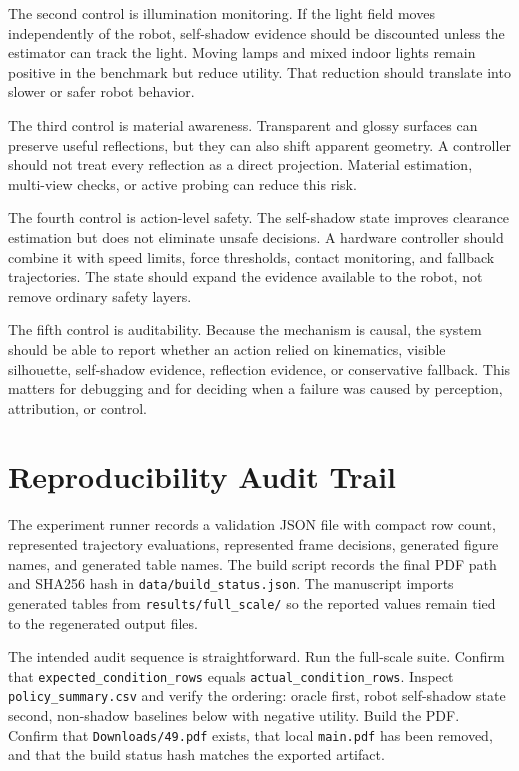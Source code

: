 \documentclass{article}
\begin{document}
The second control is illumination monitoring. If the light field moves independently of the robot, self-shadow evidence should be discounted unless the estimator can track the light. Moving lamps and mixed indoor lights remain positive in the benchmark but reduce utility. That reduction should translate into slower or safer robot behavior.

The third control is material awareness. Transparent and glossy surfaces can preserve useful reflections, but they can also shift apparent geometry. A controller should not treat every reflection as a direct projection. Material estimation, multi-view checks, or active probing can reduce this risk.

The fourth control is action-level safety. The self-shadow state improves clearance estimation but does not eliminate unsafe decisions. A hardware controller should combine it with speed limits, force thresholds, contact monitoring, and fallback trajectories. The state should expand the evidence available to the robot, not remove ordinary safety layers.

The fifth control is auditability. Because the mechanism is causal, the system should be able to report whether an action relied on kinematics, visible silhouette, self-shadow evidence, reflection evidence, or conservative fallback. This matters for debugging and for deciding when a failure was caused by perception, attribution, or control.

\clearpage
\section{Reproducibility Audit Trail}

The experiment runner records a validation JSON file with compact row count, represented trajectory evaluations, represented frame decisions, generated figure names, and generated table names. The build script records the final PDF path and SHA256 hash in \texttt{data/build\_status.json}. The manuscript imports generated tables from \texttt{results/full\_scale/} so the reported values remain tied to the regenerated output files.

The intended audit sequence is straightforward. Run the full-scale suite. Confirm that \texttt{expected\_condition\_rows} equals \texttt{actual\_condition\_rows}. Inspect \texttt{policy\_summary.csv} and verify the ordering: oracle first, robot self-shadow state second, non-shadow baselines below with negative utility. Build the PDF. Confirm that \texttt{Downloads/49.pdf} exists, that local \texttt{main.pdf} has been removed, and that the build status hash matches the exported artifact.
\end{document}

